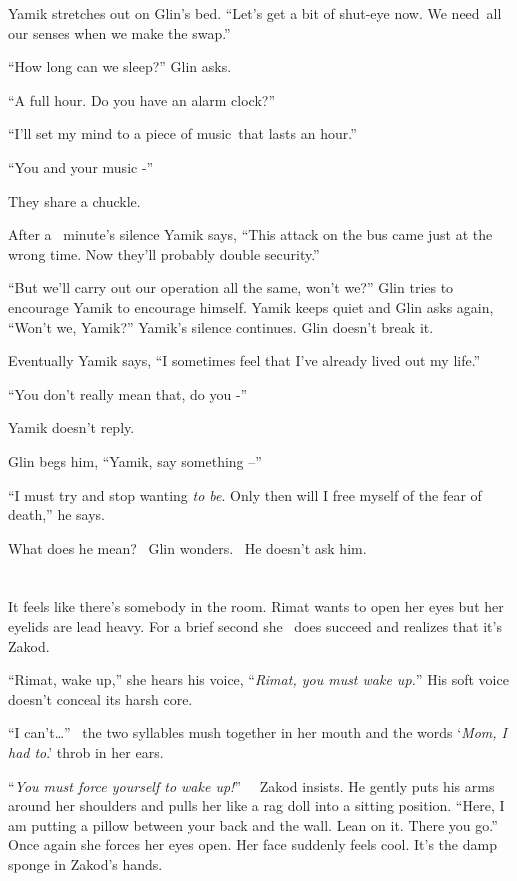 \documentclass[twoside,11pt]{book}
\begin{document}
Yamik stretches out on Glin's bed. ``Let's get a bit of shut-eye now. We need~all our senses when we make
the swap.''

``How long can we sleep?'' Glin asks.

``A full hour. Do you have an alarm clock?''

``I'll set my mind to a piece of music~that lasts an hour.''

``You and your music -''

They share a chuckle.

After a \ minute's silence Yamik says, ``This attack on the bus came just at the wrong time. Now they'll
probably double security.''

``But we'll carry out our operation all the same, won't we?'' Glin tries to encourage Yamik to
encourage himself. Yamik keeps quiet and Glin asks again, ``Won't we, Yamik?'' Yamik's
silence continues. Glin doesn't break it.

Eventually Yamik says, ``I sometimes feel that I've already lived out my life.''

``You don't really mean that, do you -''

Yamik doesn't reply.

Glin begs him, ``Yamik, say something --''

``I must try and stop wanting \textit{to be}. Only then will I free myself of the fear of
death,'' he says.

What does he mean? \ Glin wonders. \ He doesn't ask him.


\bigskip

\chapter{}

It feels like there's somebody in the room. Rimat wants to open her eyes but her eyelids are lead heavy. For a brief
second she \ does succeed and realizes that it's Zakod.

``Rimat, wake up,'' she hears his voice, ``\textit{Rimat, you must wake up.}{}''\textit{ }His soft voice
doesn't conceal its harsh core.

{}``I can't{\dots}'' \ the two syllables mush together in her mouth and the words `\textit{Mom, I had to}.' throb in her
ears.

{}``\textit{You must force yourself to wake up!}{}'' \textit{\ }\ Zakod insists. He gently puts his arms around her
shoulders and pulls her like a rag doll into a sitting position. ``Here, I am putting a pillow between your back and
the wall. Lean on it. There you go.'' Once again she forces her eyes open. Her face suddenly feels cool. It's the damp
sponge in Zakod's hands.
\end{document}
